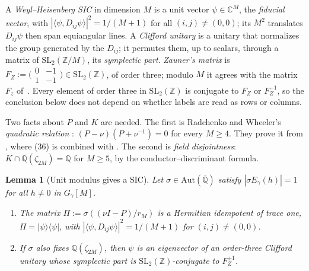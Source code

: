 \documentclass[11pt]{amsart}
\numberwithin{equation}{section}
\theoremstyle{plain}
\newtheorem{lemma}[theorem]{Lemma}
\theoremstyle{definition}
\theoremstyle{remark}
\begin{document}
A \emph{Weyl--Heisenberg SIC} in dimension \(M\) is a unit vector \(\psi\in\mathbb C^M\), the \emph{fiducial vector}, with \(|\langle\psi,D_{ij}\psi\rangle|^2=1/(M+1)\) for all \((i,j)\ne(0,0)\); its \(M^2\) translates \(D_{ij}\psi\) then span equiangular lines. A \emph{Clifford unitary} is a unitary that normalizes the group generated by the \(D_{ij}\); it permutes them, up to scalars, through a matrix of \(\mathrm{SL}_2(\mathbb Z/M)\), its \emph{symplectic part}. \emph{Zauner's matrix} is \(F_Z:=\bigl(\begin{smallmatrix}0&-1\\1&-1\end{smallmatrix}\bigr)\in\mathrm{SL}_2(\mathbb Z)\), of order three; modulo \(M\) it agrees with the matrix \(F_z\) of~\cite[Def.~3.12]{AFK}. Every element of order three in \(\mathrm{SL}_2(\mathbb Z)\) is conjugate to \(F_Z\) or \(F_Z^{-1}\), so the conclusion below does not depend on whether labels are read as rows or columns.

Two facts about \(P\) and \(K\) are needed. The first is Radchenko and Wheeler's \emph{quadratic relation} \cite[Thm.~7, (39)]{RW}: \((P-\nu)(P+\nu^{-1})=0\) for every \(M\ge4\). They prove it from \cite[(36), (38), (5)]{RW}, where (36) is \cite[(7)]{RW} combined with \cite[(5)]{RW}. The second is \emph{field disjointness}: \(K\cap\mathbb Q(\zeta_{2M})=\mathbb Q\) for \(M\ge5\), by the conductor--discriminant formula.

\begin{lemma}[Unit modulus gives a SIC]\label{lem:unitsic}
Let \(\sigma\in\mathrm{Aut}(\overline{\mathbb Q})\) satisfy \(|\sigma E_\gamma(h)|=1\) for all \(h\ne0\) in \(G_\gamma[M]\).
\begin{enumerate}
\item[(a)] The matrix \(\Pi:=\sigma((\nu I-P)/r_M)\) is a Hermitian idempotent of trace one, \(\Pi=|\psi\rangle\langle\psi|\), with \(|\langle\psi,D_{ij}\psi\rangle|^2=1/(M+1)\) for \((i,j)\ne(0,0)\).
\item[(b)] If \(\sigma\) also fixes \(\mathbb Q(\zeta_{2M})\), then \(\psi\) is an eigenvector of an order-three Clifford unitary whose symplectic part is \(\mathrm{SL}_2(\mathbb Z)\)-conjugate to \(F_Z^{\pm1}\).
\end{enumerate}
\end{lemma}
\end{document}
